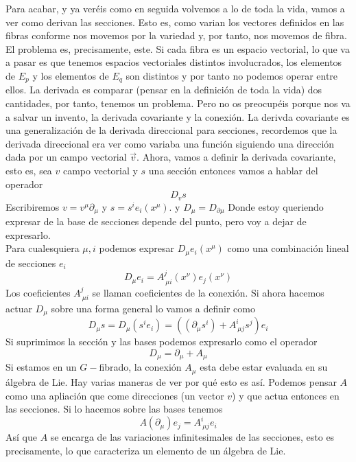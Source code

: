 \documentclass[12pt]{article}
\begin{document}
Para acabar, y ya veréis como en seguida volvemos a lo de toda la vida, vamos a ver como derivan las secciones. Esto es, como varian los vectores definidos en las fibras conforme nos movemos por la variedad y, por tanto, nos movemos de fibra. El problema es, precisamente, este. Si cada fibra es un espacio vectorial, lo que va a pasar es que tenemos espacios vectoriales distintos involucrados, los elementos de $E_p$ y los elementos de $E_q$ son distintos y por tanto no podemos operar entre ellos. La derivada es comparar (pensar en la definición de toda la vida) dos cantidades, por tanto, tenemos un problema. Pero no os preocupéis porque nos va a salvar un invento, la derivada covariante y la conexión. La derivda covariante es una generalización de la derivada direccional para secciones, recordemos que la derivada direccional era ver como variaba una función siguiendo una dirección dada por un campo vectorial $\vec v$. Ahora, vamos a definir la derivada covariante, esto es, sea $v$ campo vectorial y $s$ una sección entonces vamos a hablar del operador 
\begin{equation}
    D_v s
\end{equation}
Escribiremos $v=v^\mu \partial_\mu$ y $s=s^i e_i(x^\mu)$. y $D_\mu =D_{\partial \mu}$ Donde estoy queriendo expresar de la base de secciones depende del punto, pero voy a dejar de expresarlo.\\
Para cualesquiera $\mu, i$ podemos expresar $D_\mu e_i(x^\mu)$ como una combinación lineal de secciones $e_i$  
\begin{equation}
    D_\mu e_i =A^j _{\ \mu i}(x^\nu)e_j(x^\nu)
\end{equation}
Los coeficientes $A^j _{\ \mu i}$ se llaman coeficientes de la conexión. Si ahora hacemos actuar $D_\mu $ sobre una forma general lo vamos a definir como
\begin{equation}
    D_\mu s = D_\mu (s^i e_i) =((\partial_\mu s^i)+ A^i_{\ \mu j}s^j)e_i 
\end{equation}
Si suprimimos la sección y las bases podemos expresarlo como el operador
\begin{equation}
    D_\mu =\partial_\mu + A_\mu 
\end{equation}
Si estamos en un $G-$fibrado, la conexión $A_\mu$ esta debe estar evaluada en su álgebra de Lie. Hay varias maneras de ver por qué esto es así. Podemos pensar $A$ como una apliación que come direcciones (un vector $v$) y que actua entonces en las secciones. Si lo hacemos sobre las bases tenemos
\begin{equation}
    A(\partial _\mu) e_j =A^i_{\ \mu j}e_i
\end{equation}
Así que $A$ se encarga de las variaciones infinitesimales de las secciones, esto es precisamente, lo que caracteriza un elemento de un álgebra de Lie. \\
\end{document}
